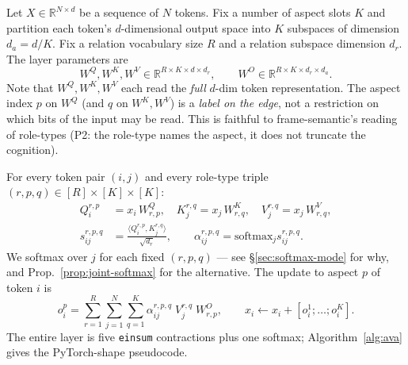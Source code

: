 \documentclass{article}
\newcommand{\R}{\mathbb{R}}
\newcommand{\softmax}{\mathrm{softmax}}
\begin{document}
Let $X \in \R^{N \times d}$ be a sequence of $N$ tokens. Fix a number
of aspect slots $K$ and partition each token's $d$-dimensional output
space into $K$ subspaces of dimension $d_a = d/K$. Fix a relation
vocabulary size $R$ and a relation subspace dimension $d_r$. The
layer parameters are
\begin{equation}
  W^Q, W^K, W^V \in \R^{R \times K \times d \times d_r}, \qquad
  W^O \in \R^{R \times K \times d_r \times d_a}.
\end{equation}
Note that $W^Q, W^K, W^V$ each read the \emph{full} $d$-dim token
representation. The aspect index $p$ on $W^Q$ (and $q$ on $W^K, W^V$) is
a \emph{label on the edge}, not a restriction on which bits of the
input may be read. This is faithful to frame-semantic's reading of
role-types (P2: the role-type names the aspect, it does not truncate the
cognition).

For every token pair $(i, j)$ and every role-type triple $(r, p, q) \in
[R] \times [K] \times [K]$:
\begin{align}
  Q^{r,p}_i &= x_i \, W^Q_{r,p}, \quad
  K^{r,q}_j = x_j \, W^K_{r,q}, \quad
  V^{r,q}_j = x_j \, W^V_{r,q}, \\
  s^{r,p,q}_{ij} &= \frac{\langle Q^{r,p}_i, K^{r,q}_j \rangle}{\sqrt{d_r}},
  \qquad
  \alpha^{r,p,q}_{ij} = \softmax_{j} s^{r,p,q}_{ij}.
  \label{eq:ava-attn}
\end{align}
We softmax over $j$ for each fixed $(r, p, q)$ — see \S\ref{sec:softmax-mode}
for why, and Prop.~\ref{prop:joint-softmax} for the alternative. The
update to aspect $p$ of token $i$ is
\begin{equation}
  o^p_i = \sum_{r=1}^{R} \sum_{j=1}^{N} \sum_{q=1}^{K}
          \alpha^{r,p,q}_{ij} \; V^{r,q}_j \; W^O_{r,p},
  \qquad
  x_i \leftarrow x_i + [o^1_i; \ldots; o^K_i].
  \label{eq:ava-out}
\end{equation}
The entire layer is five \texttt{einsum} contractions plus one
softmax; Algorithm~\ref{alg:ava} gives the PyTorch-shape pseudocode.
\end{document}
